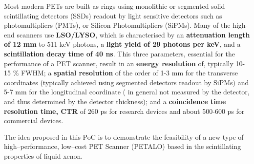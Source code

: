 \documentclass[11pt,a4paper]{article}
\begin{document}
Most modern PETs are built as rings using monolithic or segmented solid scintillating detectors (SSDs) readout by light sensitive detectors such as photomultipliers (PMTs), or Silicon Photomultipliers (SiPMs). Many of the high-end scanners use {\bf LSO/LYSO}, which is characterised by an {\bf attenuation length of 12 mm} to 511 keV photons, a  {\bf light yield of 29 photons per keV}, and a {\bf scintillation decay time of 40 ns}. This three parameters, essential for the performance of a PET scanner, result in an {\bf energy resolution} of, typically 10-15 \% FWHM; a {\bf spatial resolution} of the order of 1-3 mm for the transverse coordinates (typically achieved using segmented detectors readout by SiPMs) and 5-7 mm for the longitudinal coordinate ( in general not measured by the detector, and thus determined by the detector thickness); and a {\bf coincidence time resolution time, CTR} of 260 ps for research devices and about 500-600 ps for commercial devices.
\begin{framed}
The idea proposed in this PoC is to demonstrate the feasibility of a new type of high--performance, low--cost PET Scanner (PETALO) based in the scintillating properties of liquid xenon. 
 \end{framed}
\end{document}
